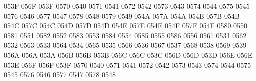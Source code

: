 \setcclcuc 053F 056F 053F %
 0570 0540 %
 0571 0541 %
 0572 0542 %
 0573 0543 %
 0574 0544 %
 0575 0545 %
 0576 0546 %
 0577 0547 %
 0578 0548 %
 0579 0549 %
\setcclcuc 054A 057A 054A %
\setcclcuc 054B 057B 054B %
\setcclcuc 054C 057C 054C %
\setcclcuc 054D 057D 054D %
\setcclcuc 054E 057E 054E %
\setcclcuc 054F 057F 054F %
 0580 0550 %
 0581 0551 %
 0582 0552 %
 0583 0553 %
 0584 0554 %
 0585 0555 %
 0586 0556 %
 0561 0531 %
 0562 0532 %
 0563 0533 %
 0564 0534 %
 0565 0535 %
 0566 0536 %
 0567 0537 %
 0568 0538 %
 0569 0539 %
\setcclcuc 056A 056A 053A %
\setcclcuc 056B 056B 053B %
\setcclcuc 056C 056C 053C %
\setcclcuc 056D 056D 053D %
\setcclcuc 056E 056E 053E %
\setcclcuc 056F 056F 053F %
 0570 0540 %
 0571 0541 %
 0572 0542 %
 0573 0543 %
 0574 0544 %
 0575 0545 %
 0576 0546 %
 0577 0547 %
 0578 0548 %

